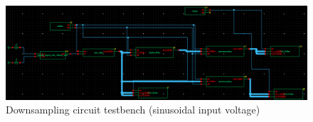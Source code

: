 \begin{figure}[!h]
	\centering 
	\includegraphics[scale=0.54]{images/DownsamplingCircuit/wav_downsampling_comparison.png}
	\caption{Downsampling circuit testbench (sinusoidal input voltage)}
	\label{fig:downsamplingSinusTestbench}
\end{figure} 

\begin{figure}[!h]%
	\centering
	\qquad

\end{figure}
